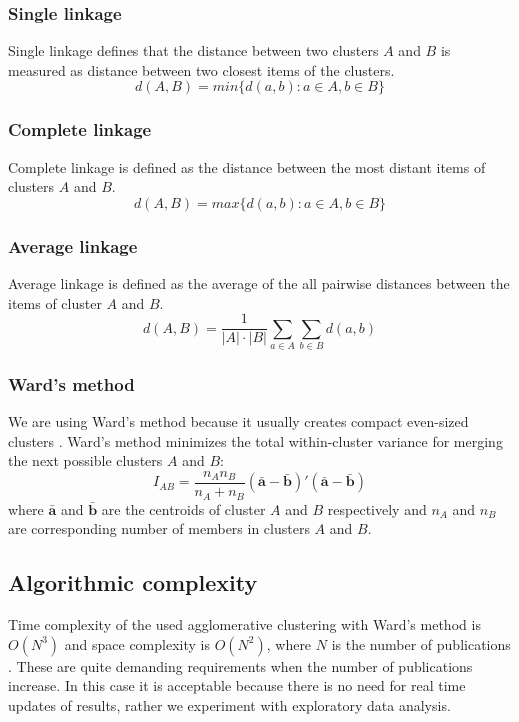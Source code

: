 \subsubsection{Single linkage}
Single linkage defines that the distance between two clusters $A$ 
and $B$ is measured as distance between two closest items of the 
clusters.
\begin{equation}
 d(A,B) = min\{d(a,b):a \in A, b \in B\}
\end{equation}

\subsubsection{Complete linkage}
Complete linkage is defined as the distance between the most 
distant items of clusters $A$ and $B$.
\begin{equation}
 d(A,B) = max\{d(a,b):a \in A, b \in B\}
\end{equation}

\subsubsection{Average linkage}
Average linkage is defined as the average of the all pairwise 
distances between the items of cluster $A$ and $B$.
\begin{equation}
 d(A,B) = \frac{1}{|A| \cdot |B|} \sum_{a \in A} \sum_{b \in B}d(a,b)
\end{equation}

\subsubsection{Ward's method}
We are using Ward's method because it usually creates compact 
even-sized clusters \cite{strauss_generalising_2017}. Ward's 
method minimizes the total within-cluster variance for merging 
the next possible clusters $A$ and $B$:
\begin{equation}
 I_{AB} = \frac{n_A n_B}{n_A + n_B} (\bar{\textbf{a}} - \bar{\textbf{b}})'(\bar{\textbf{a}}-\bar{\textbf{b}})
\end{equation}
where $\bar{\textbf{a}}$ and $\bar{\textbf{b}}$ are the centroids
of cluster $A$ and $B$ respectively and $n_A$ and $n_B$ are
corresponding number of members in clusters $A$ and $B$.


\subsection{Algorithmic complexity}
Time complexity of the used agglomerative clustering with Ward's 
method is $O(N^3)$ and space complexity is $O(N^2)$, 
where $N$ is the number of publications 
\cite{willett_recent_1988}. These are quite demanding requirements
when the number of publications increase. In this case it is 
acceptable because there is no need for real time updates of 
results, rather we experiment with exploratory data analysis.



